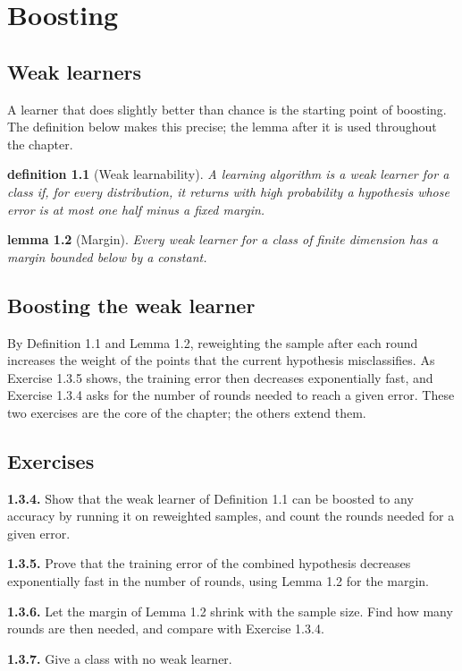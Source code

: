 \documentclass[11pt]{book}
\theoremstyle{smallcaps}
\newtheorem{definition}{definition}[chapter]
\newtheorem{lemma}[definition]{lemma}
\begin{document}
\frontmatter
\tableofcontents
\mainmatter
\chapter{Boosting}
\section{Weak learners}
A learner that does slightly better than chance is the starting point of boosting. The definition below makes this
precise; the lemma after it is used throughout the chapter.
\begin{definition}[Weak learnability]
A learning algorithm is a weak learner for a class if, for every distribution, it returns with high probability a
hypothesis whose error is at most one half minus a fixed margin.
\end{definition}
\begin{lemma}[Margin]
Every weak learner for a class of finite dimension has a margin bounded below by a constant.
\end{lemma}
\section{Boosting the weak learner}
By Definition 1.1 and Lemma 1.2, reweighting the sample after each round increases the weight of the points that the
current hypothesis misclassifies. As Exercise 1.3.5 shows, the training error then decreases exponentially fast, and
Exercise 1.3.4 asks for the number of rounds needed to reach a given error. These two exercises are the core of the
chapter; the others extend them.
\section{Exercises}
\noindent\textbf{1.3.4.} Show that the weak learner of Definition 1.1 can be boosted to any accuracy by running it
on reweighted samples, and count the rounds needed for a given error.\par\medskip
\noindent\textbf{1.3.5.} Prove that the training error of the combined hypothesis decreases exponentially fast in the
number of rounds, using Lemma 1.2 for the margin.\par\medskip
\noindent\textbf{1.3.6.} Let the margin of Lemma 1.2 shrink with the sample size. Find how many rounds are then
needed, and compare with Exercise 1.3.4.\par\medskip
\noindent\textbf{1.3.7.} Give a class with no weak learner.\par
\end{document}
